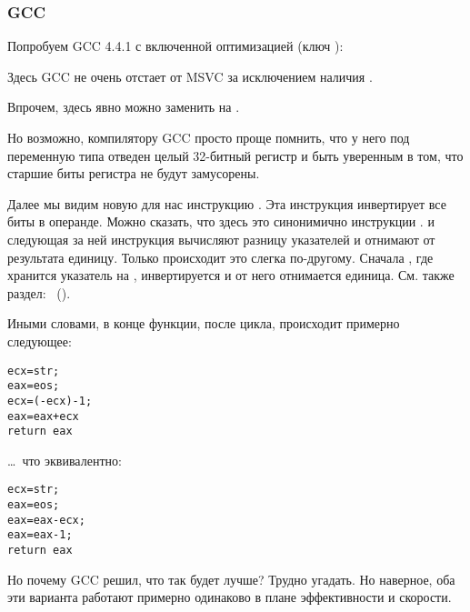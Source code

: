 \ifdefined\IncludeGCC
\subsubsection{\Optimizing GCC}

Попробуем GCC 4.4.1 с включенной оптимизацией (ключ \Othree):



Здесь GCC не очень отстает от MSVC за исключением наличия \MOVZX. 

Впрочем, \MOVZX здесь явно можно заменить на .

Но возможно, компилятору GCC просто проще помнить, что у него под переменную типа \Tchar отведен целый 
32-битный регистр \EDX и быть уверенным в том, что старшие биты регистра не будут замусорены.

\label{strlen_NOT_ADD}
Далее мы видим новую для нас инструкцию \NOT. Эта инструкция инвертирует все биты в операнде. 
Можно сказать, что здесь это синонимично инструкции . 
\NOT и следующая за ней инструкция \ADD вычисляют разницу указателей и отнимают от результата единицу. 
Только происходит это слегка по-другому. Сначала \ECX, где хранится указатель на , 
инвертируется и от него отнимается единица.
См. также раздел: \q{\SignedNumbersSectionName}~().

Иными словами, в конце функции, после цикла, происходит примерно следующее: 

\begin{lstlisting}
ecx=str;
eax=eos;
ecx=(-ecx)-1; 
eax=eax+ecx
return eax
\end{lstlisting}

\dots~что эквивалентно:

\begin{lstlisting}
ecx=str;
eax=eos;
eax=eax-ecx;
eax=eax-1;
return eax
\end{lstlisting}

Но почему GCC решил, что так будет лучше? Трудно угадать.
Но наверное, оба эти варианта работают примерно одинаково в плане эффективности и скорости.

\fi
